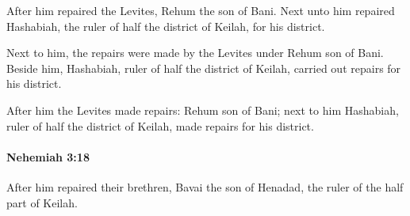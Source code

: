 			\begin{versebox}
					\item[BHS] 
					\item[LXX] 
					\item[ASV] After him repaired the Levites, Rehum the son of Bani. Next unto him repaired Hashabiah, the ruler of half the district of Keilah, for his district.
					\item[NIV] Next to him, the repairs were made by the Levites under Rehum son of Bani. Beside him, Hashabiah, ruler of half the district of Keilah, carried out repairs for his district.
					\item[NRSV] After him the Levites made repairs: Rehum son of Bani; next to him Hashabiah, ruler of half the district of Keilah, made repairs for his district.
			\end{versebox}

		\paragraph{Nehemiah 3:18} %
			\label{NEHEMIAH-3-18}

			After him repaired their brethren, Bavai the son of Henadad, the ruler of the half part of Keilah.

